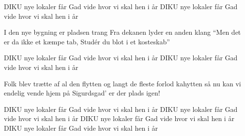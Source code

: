 \documentclass[a4paper,11pt]{article}
\begin{document}
\begin{song}
   DIKU nye lokaler får
                Gad vide hvor vi skal hen i år
   DIKU nye lokaler får
               Gad vide hvor vi skal hen i år


   I den nye bygning er pladsen trang
             Fra dekanen lyder en anden klang
   ``Men det er da ikke et kæmpe tab,
             Studér du blot i et kosteskab''


   DIKU nye lokaler får
                Gad vide hvor vi skal hen i år
   DIKU nye lokaler får
               Gad vide hvor vi skal hen i år

   Folk blev trætte af al den flytten
             og langt de fleste forlod kahytten
   så nu kan vi endelig vende hjem
             på Sigurdsgad' er der plads igen!


   DIKU nye lokaler får
                Gad vide hvor vi skal hen i år
   DIKU nye lokaler får
               Gad vide hvor vi skal hen i år
   DIKU nye lokaler får
               Gad vide hvor vi skal hen i år
   DIKU nye lokaler får
               Gad vide hvor vi skal hen i år

\end{song}
\end{document}
